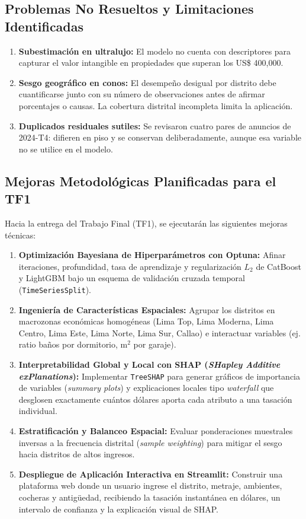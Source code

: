 \documentclass[11pt,a4paper]{article}
\begin{document}
\subsection{Problemas No Resueltos y Limitaciones Identificadas}
\begin{enumerate}[leftmargin=1.5cm]
    \item \textbf{Subestimación en ultralujo:} El modelo no cuenta con descriptores para capturar el valor intangible en propiedades que superan los US\$ 400,000.
    \item \textbf{Sesgo geográfico en conos:} El desempeño desigual por distrito debe cuantificarse junto con su número de observaciones antes de afirmar porcentajes o causas. La cobertura distrital incompleta limita la aplicación.
    \item \textbf{Duplicados residuales sutiles:} Se revisaron cuatro pares de anuncios de 2024-T4: difieren en piso y se conservan deliberadamente, aunque esa variable no se utilice en el modelo.
\end{enumerate}

\subsection{Mejoras Metodológicas Planificadas para el TF1}
Hacia la entrega del Trabajo Final (TF1), se ejecutarán las siguientes mejoras técnicas:
\begin{enumerate}[leftmargin=1.5cm]
    \item \textbf{Optimización Bayesiana de Hiperparámetros con Optuna:} Afinar iteraciones, profundidad, tasa de aprendizaje y regularización $L_2$ de CatBoost y LightGBM bajo un esquema de validación cruzada temporal (\texttt{TimeSeriesSplit}).
    \item \textbf{Ingeniería de Características Espaciales:} Agrupar los distritos en macrozonas económicas homogéneas (Lima Top, Lima Moderna, Lima Centro, Lima Este, Lima Norte, Lima Sur, Callao) e interactuar variables (ej. ratio baños por dormitorio, m$^2$ por garaje).
    \item \textbf{Interpretabilidad Global y Local con SHAP (\textit{SHapley Additive exPlanations}):} Implementar \texttt{TreeSHAP} para generar gráficos de importancia de variables (\textit{summary plots}) y explicaciones locales tipo \textit{waterfall} que desglosen exactamente cuántos dólares aporta cada atributo a una tasación individual.
    \item \textbf{Estratificación y Balanceo Espacial:} Evaluar ponderaciones muestrales inversas a la frecuencia distrital (\textit{sample weighting}) para mitigar el sesgo hacia distritos de altos ingresos.
    \item \textbf{Despliegue de Aplicación Interactiva en Streamlit:} Construir una plataforma web donde un usuario ingrese el distrito, metraje, ambientes, cocheras y antigüedad, recibiendo la tasación instantánea en dólares, un intervalo de confianza y la explicación visual de SHAP.
\end{enumerate}
\end{document}
